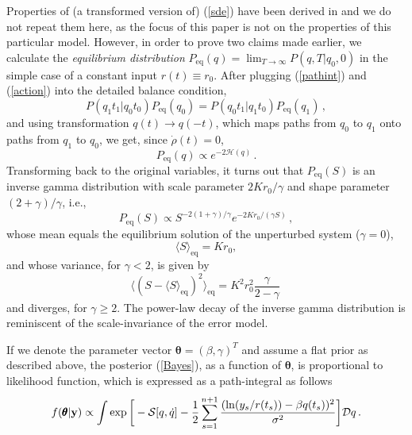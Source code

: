\documentclass[12pt,a4paper,final]{iopart}
\newcommand{\eq}{\mbox{eq}}
\newcommand{\bt}{\pmb\theta}
\newcommand{\vc}[1]{{\bf #1 }}
\begin{document}
Properties of (a transformed version of) (\ref{sde}) have been derived in \cite{} and we do not repeat them here, as the focus of this paper is not on the properties of this particular model. However, in order to prove two claims made earlier, we calculate the {\em equilibrium distribution} $P_{\eq}(q) = \lim_{T\rightarrow\infty} P(q,T|q_0,0)$ in the simple case of a constant input $r(t)\equiv r_{0}$. After plugging (\ref{pathint}) and (\ref{action}) into the detailed balance condition,
\begin{equation}\label{detailed_balance}
P(q_1 t_1 | q_0 t_0 ) P_{\eq}(q_0) = P(q_0 t_1 | q_1 t_0 ) P_{\eq}(q_1) \,,
\end{equation}
and using transformation $q(t) \rightarrow q(-t)$, which maps paths from $q_0$ to $q_1$ onto paths from $q_1$ to $q_0$, we get, since $\dot\rho(t)= 0$,
\begin{equation}\label{Peq}
  P_{\eq}(q)
  \propto
  e^{-2\mathcal{H}(q)}\,.
\end{equation}
Transforming back to the original variables, it turns out that $P_{\eq}(S)$ is an inverse gamma distribution with scale parameter $2Kr_{0}/\gamma$ and shape parameter $(2+\gamma)/\gamma$, i.e.,
\begin{equation}\label{inverse_gamma}
  P_{\eq}(S)
  \propto
  S^{-2(1+\gamma)/\gamma}e^{-2Kr_{0}/(\gamma S)}\,,
\end{equation}
whose mean equals the equilibrium solution of the unperturbed system ($\gamma=0$),
\begin{equation}\label{equilibrium_mean}
  \langle S\rangle_{\eq}=Kr_{0},
\end{equation}
and whose variance, for $\gamma< 2$, is given by
\begin{equation}
  \langle (S - \langle S\rangle_{\eq})^2\rangle_{\eq}
  =
  K^2r_{0}^2
  \frac{\gamma}{2-\gamma}\,
\end{equation}
and diverges, for $\gamma\geq 2$.
The power-law decay of the inverse gamma distribution is reminiscent of the scale-invariance of the error model.

If we denote the parameter vector $\bt=(\beta,\gamma)^T$ and assume a flat prior as described above, the posterior (\ref{Bayes}), as a function of $\bt$, is proportional to likelihood function, which is expressed as a path-integral as follows
\begin{equation}\label{posterior_pathint}
  f(\bt | \vc y)
  \propto
  \int
  \exp\bigg[
    -{{\mathcal S}}[{q},\dot q]
    -\frac{1}{2}
    \sum_{s=1}^{n+1}
    \frac
    {(\ln(y_s/r(t_s))-{\beta q(t_s)})^2}
    {\sigma^2}
  \bigg]
  {\mathcal Dq}
  \,.
\end{equation}
\end{document}
